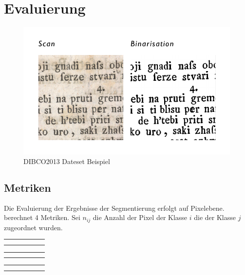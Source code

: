 \section{Evaluierung}

\begin{figure}
    \includegraphics[]{figures/tasks/DIBCO2013-dataset.pdf} 
    \caption{DIBCO2013 Dateset Beispiel}
\end{figure}

\subsection{Metriken}
Die Evaluierung der Ergebnisse der Segmentierung erfolgt auf Pixelebene.
\cite{long_fully_2015} berechnet 4 Metriken.
Sei \(n_{ij}\) die Anzahl der Pixel der Klasse \(i\) die der Klasse \(j\) zugeordnet wurden.


\newcommand{\resulttable}[2]{
    \begin{tabular}{l|r|r|r|r|r}%
        \hline
        \csvreader[head to column names, filter equal={\dataset}{#1}]{results/document_image_segmentation_results.csv}{}%
        {#2}
        \\\hline
        \end
        {tabular}
}

\resulttable{CB55}{\\ \name & \pixelacc & \FgPA & \meanacc & \meanIU & \fwIU}
\resulttable{CSG18}{\\  \pixelacc & \FgPA & \meanacc & \meanIU & \fwIU}
\resulttable{CSG863}{\\  \pixelacc & \FgPA & \meanacc & \meanIU & \fwIU}
